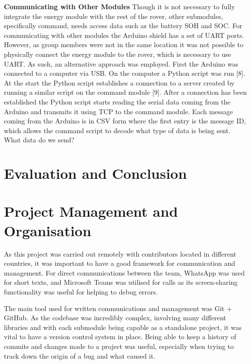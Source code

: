 \documentclass[a4paper]{article}
\begin{document}
\textbf{Communicating with Other Modules}
\vspace{10pt} 
\newline
Though it is not necessary to fully integrate the energy module with the rest of 
the rover, other submodules, specifically command, needs access data such as the 
battery SOH and SOC. For communicating with other modules the Arduino shield has 
a set of UART ports. However, as group members were not in the same location it 
was not possible to physically connect the energy module to the rover, which is 
necessary to use UART. As such, an alternative approach was employed. First the 
Arduino was connected to a computer via USB. On the computer a Python script was 
run [8]. At the start the Python script establishes a connection to a server 
created by running a similar script on the command module [9]. After a 
connection has been established the Python script starts reading the serial data 
coming from the Arduino and transmits it using TCP to the command module. Each 
message coming from the Arduino is in CSV form where the first entry is the 
message ID, which allows the command script to decode what type of data is being 
sent. What data do we send? 


\section{Evaluation and Conclusion}

\section{Project Management and Organisation}
As this project was carried out remotely
with contributors located in different countries, 
it was important to have a good framework for communication and management. 
For direct communications between the team, WhatsApp was used for short texts, 
and Microsoft Teams was utilised for calls as its screen-sharing functionality 
was useful for helping to debug errors. 

The main tool used for written communications and management was Git + GitHub.
As the codebase was incredibly complex, 
involving many different libraries and with each submodule being capable as a
standalone project, it was vital to have a version control system in place. 
Being able to keep a history of commits and changes made to a project was useful,
especially when trying to track down the origin of a bug and what caused it. 
\end{document}
